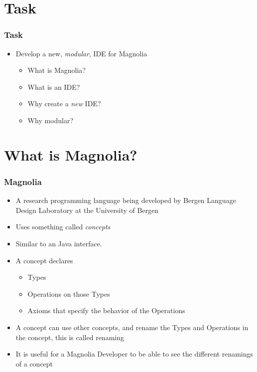 \section{Task}
\SectionPage

\begin{frame}
  \frametitle{Task}
  \begin{itemize}
    \item Develop a new, \textit{modular}, IDE for Magnolia
    \begin{itemize}
      \item What is Magnolia?
      \item What is an IDE?
      \item Why create a \textit{new} IDE?
      \item Why modular?
    \end{itemize}
  \end{itemize}
\end{frame}

\section{What is Magnolia?}
\SectionPage

\begin{frame}
  \frametitle{Magnolia}
  \begin{itemize}
    \item A research programming language being developed by
      Bergen Language Design Laboratory at the University of Bergen
    \item Uses something called \textit{concepts}
    \item Similar to an Java interface.
    \item A concept declares
    \begin{itemize}
      \item Types
      \item Operations on those Types
      \item Axioms that specify the behavior of the Operations
    \end{itemize}
    \item A concept can use other concepts, and rename the Types and Operations
      in the concept, this is called renaming
    \item It is useful for a Magnolia Developer to be able to see the different
      renamings of a concept
  \end{itemize}
\end{frame}

